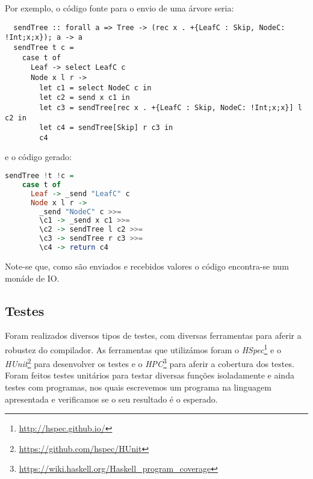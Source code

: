 \begin{itemize}
%  
%  
Por exemplo, o código fonte para o envio de uma árvore seria:

\begin{lstlisting}
  sendTree :: forall a => Tree -> (rec x . +{LeafC : Skip, NodeC: !Int;x;x}); a -> a
  sendTree t c =
    case t of
      Leaf -> select LeafC c
      Node x l r ->
        let c1 = select NodeC c in
        let c2 = send x c1 in
        let c3 = sendTree[rec x . +{LeafC : Skip, NodeC: !Int;x;x}] l c2 in
        let c4 = sendTree[Skip] r c3 in
        c4
\end{lstlisting}

e o código gerado:
\begin{lstlisting}[language=Haskell]
  sendTree !t !c =
    case t of 
      Leaf -> _send "LeafC" c 
      Node x l r ->
        _send "NodeC" c >>=
        \c1 -> _send x c1 >>=
        \c2 -> sendTree l c2 >>=
        \c3 -> sendTree r c3 >>=
        \c4 -> return c4 
\end{lstlisting}

Note-se que, como são enviados e recebidos valores o código encontra-se num monáde de IO. 

\end{itemize}

\subsection{Testes}

Foram realizados diversos tipos de testes, com diversas ferramentas para aferir a robustez do compilador. As ferramentas que utilizámos foram o \textit{HSpec}\footnote{\url{http://hspec.github.io/}} e o \textit{HUnit}\footnote{\url{https://github.com/hspec/HUnit}} para desenvolver os testes e o \textit{HPC}\footnote{\url{https://wiki.haskell.org/Haskell_program_coverage}} para aferir a cobertura dos testes. Foram feitos testes unitários para testar diversas funções isoladamente e ainda testes com programas, nos quais escrevemos um programa na linguagem apresentada e verificamos se o seu resultado é o esperado.



